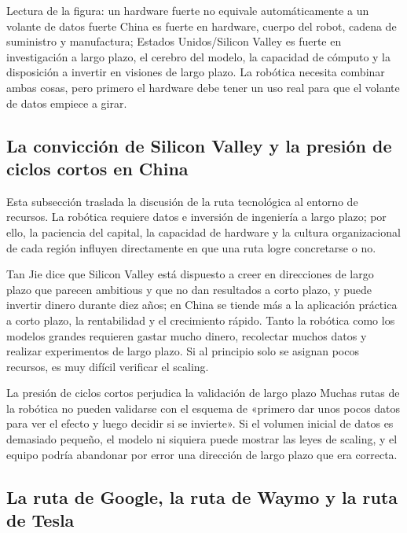 \documentclass[a4paper]{article}
\begin{document}
\begin{knowledgebox}{Lectura de la figura: un hardware fuerte no equivale automáticamente a un volante de datos fuerte}
China es fuerte en hardware, cuerpo del robot, cadena de suministro y manufactura; Estados Unidos/Silicon Valley es fuerte en investigación a largo plazo, el cerebro del modelo, la capacidad de cómputo y la disposición a invertir en visiones de largo plazo. La robótica necesita combinar ambas cosas, pero primero el hardware debe tener un uso real para que el volante de datos empiece a girar.
\end{knowledgebox}

\subsection{La convicción de Silicon Valley y la presión de ciclos cortos en China}

Esta subsección traslada la discusión de la ruta tecnológica al entorno de recursos. La robótica requiere datos e inversión de ingeniería a largo plazo; por ello, la paciencia del capital, la capacidad de hardware y la cultura organizacional de cada región influyen directamente en que una ruta logre concretarse o no.

Tan Jie dice que Silicon Valley está dispuesto a creer en direcciones de largo plazo que parecen ambitious y que no dan resultados a corto plazo, y puede invertir dinero durante diez años; en China se tiende más a la aplicación práctica a corto plazo, la rentabilidad y el crecimiento rápido. Tanto la robótica como los modelos grandes requieren gastar mucho dinero, recolectar muchos datos y realizar experimentos de largo plazo. Si al principio solo se asignan pocos recursos, es muy difícil verificar el scaling.

\begin{warningbox}{La presión de ciclos cortos perjudica la validación de largo plazo}
Muchas rutas de la robótica no pueden validarse con el esquema de «primero dar unos pocos datos para ver el efecto y luego decidir si se invierte». Si el volumen inicial de datos es demasiado pequeño, el modelo ni siquiera puede mostrar las leyes de scaling, y el equipo podría abandonar por error una dirección de largo plazo que era correcta.
\end{warningbox}

\subsection{La ruta de Google, la ruta de Waymo y la ruta de Tesla}
\end{document}
